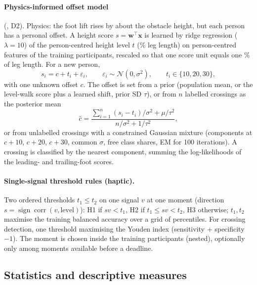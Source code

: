 \paragraph{Physics-informed offset model} (, D2). Physics: the foot lift rises by about the obstacle
height, but each person has a personal offset. A height score $s = \mathbf{w}^\top\mathbf{x}$ is learned by ridge regression
($\lambda = 10$) of the person-centred height level $t$ (\% leg length) on person-centred features of the training
participants, rescaled so that one score unit equals one \% of leg length. For a new person,
\begin{equation}
s_i = c + t_i + \varepsilon_i,\qquad \varepsilon_i \sim \mathcal{N}(0,\sigma^2),\qquad t_i \in \{10, 20, 30\},
\end{equation}
with one unknown offset $c$. The offset is set from a prior (population mean, or the level-walk score plus a learned shift,
prior SD $\tau$), or from $n$ labelled crossings as the posterior mean
\begin{equation}
\hat c = \frac{\sum_{i=1}^{n} (s_i - t_i)/\sigma^2 + \mu/\tau^2}{n/\sigma^2 + 1/\tau^2},
\end{equation}
or from unlabelled crossings with a constrained Gaussian mixture (components at $c + 10$, $c + 20$, $c + 30$, common $\sigma$,
free class shares, EM for 100 iterations). A crossing is classified by the nearest component, summing the log-likelihoods
of the leading- and trailing-foot scores.

\paragraph{Single-signal threshold rules (haptic).} Two ordered thresholds $t_1 \leq t_2$ on one signal $v$ at one moment
(direction $s = \operatorname{sign}\operatorname{corr}(v, \text{level})$): H1 if $s v < t_1$, H2 if $t_1 \leq s v < t_2$, H3
otherwise; $t_1, t_2$ maximise the training balanced accuracy over a grid of percentiles. For crossing detection, one
threshold maximising the Youden index (sensitivity + specificity $- 1$). The moment is chosen inside the training
participants (nested), optionally only among moments available before a deadline.

\subsection{Statistics and descriptive measures}
\label{sec:stats}

